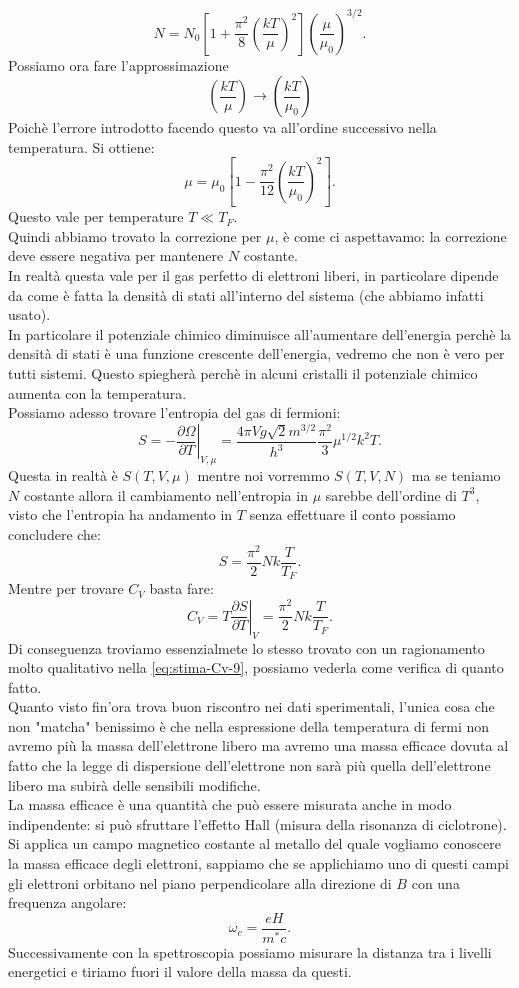 \[
	N = N_0\left[ 1 + \frac{\pi^2}{8}\left( \frac{kT}{\mu } \right) ^2 \right] \left( \frac{\mu }{\mu_0} \right) ^{3 /2}
.\] 
Possiamo ora fare l'approssimazione 
\[
\left( \frac{kT}{\mu } \right)  \to \left( \frac{kT}{\mu_0} \right) 
\]
Poichè l'errore introdotto facendo questo va all'ordine successivo nella temperatura. Si ottiene:
\[
	\mu = \mu_0\left[ 1- \frac{\pi^2}{12}\left( \frac{kT}{\mu_0} \right)^2 \right] 
.\] 
Questo vale per temperature $T \ll T_{F}$.\\
Quindi abbiamo trovato la correzione per $\mu $, è come ci aspettavamo: la correzione deve essere negativa per mantenere $N$ costante. \\
In realtà questa vale per il gas perfetto di elettroni liberi, in particolare dipende da come è fatta la densità di stati all'interno del sistema (che abbiamo infatti usato).\\
In particolare il potenziale chimico diminuisce all'aumentare dell'energia perchè la densità di stati è una funzione crescente dell'energia, vedremo che non è vero per tutti sistemi. Questo spiegherà perchè in alcuni cristalli il potenziale chimico aumenta con la temperatura.\\
Possiamo adesso trovare l'entropia del gas di fermioni:
\[
	S = - \left.\frac{\partial \Omega }{\partial T} \right|_{V,\mu } = 
		\frac{4\pi V g \sqrt{2} m ^{3 /2}}{h^3} \frac{\pi^2}{3}\mu ^{1 /2} k^2 T
.\] 
Questa in realtà è $S( T, V , \mu ) $ mentre noi vorremmo $S( T,V,N) $ ma se teniamo $N$ costante allora il cambiamento nell'entropia in $\mu $ sarebbe dell'ordine di $T^3$, visto che l'entropia ha andamento in $T$ senza effettuare il conto possiamo concludere che:
\[
	S = \frac{\pi^2}{2}Nk \frac{T}{T_{F}}
.\] 
Mentre per trovare $C_{V}$ basta fare:
\[
	C_{V} = T \left.\frac{\partial S}{\partial T} \right|_{V} = \frac{\pi^2}{2} Nk \frac{T}{T_{F}}
.\] 
Di conseguenza troviamo essenzialmete lo stesso trovato con un ragionamento molto qualitativo nella \ref{eq:stima-Cv-9}, possiamo vederla come verifica di quanto fatto.\\
Quanto visto fin'ora trova buon riscontro nei dati sperimentali, l'unica cosa che non "matcha" benissimo è che nella espressione della temperatura di fermi non avremo più la massa dell'elettrone libero ma avremo una massa efficace dovuta al fatto  che la legge di dispersione dell'elettrone non sarà più quella dell'elettrone libero ma subirà delle sensibili modifiche. \\
La massa efficace è una quantità che può essere misurata anche in modo indipendente: si può sfruttare l'effetto Hall (misura della risonanza di ciclotrone). Si applica un campo magnetico costante al metallo del quale vogliamo conoscere la massa efficace degli elettroni, sappiamo che se applichiamo uno di questi campi gli elettroni orbitano nel piano perpendicolare alla direzione di $B$ con una frequenza angolare:
\[
	\omega_{c}= \frac{eH}{ m ^{*}c}
.\] 
Successivamente con la spettroscopia possiamo misurare la distanza tra i livelli energetici e tiriamo fuori il valore della massa da questi.

